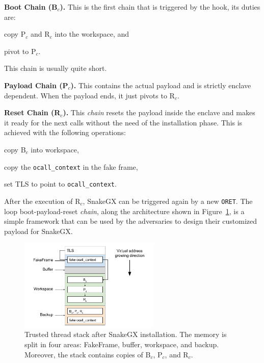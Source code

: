 \textbf{Boot Chain (B$_c$).} This is the first chain that is triggered by 
the hook, its duties are:
\begin{enumerate*}[label=(\roman*)]
	\item copy P$_c$ and R$_c$ into the workspace, and
	\item pivot to P$_c$.
\end{enumerate*} 
This chain is usually quite short.

\textbf{Payload Chain (P$_c$).} This contains the actual payload 
and is strictly enclave dependent. When the payload ends, it just pivots to 
R$_c$.

\textbf{Reset Chain (R$_c$).} 
This \emph{chain} resets the payload inside the enclave and makes it ready for 
the next calls without the need of the installation phase.
This is achieved with the following operations:
\begin{enumerate*}[label=(\roman*)]
	\item copy B$_c$ into workspace,
	\item copy the \texttt{ocall\_context} in the fake frame,
	\item set TLS to point to \texttt{ocall\_context}.
\end{enumerate*}

After the execution of R$_c$, SnakeGX can be triggered again by a new 
\texttt{ORET}.
The loop boot-payload-reset \emph{chain}, along the architecture shown in 
Figure~\ref{fig:t-thread-stack-installed}, is a simple framework that can be 
used by the adversaries to design their customized payload for SnakeGX.

\begin{figure}[t]
	\centering
	\includegraphics[width=0.6\textwidth]{fig_c5/t-thread-stack-installed.pdf}
	\caption{Trusted thread stack after SnakeGX installation. The memory is 
		split in four areas: FakeFrame, buffer, workspace, and backup. 
		Moreover, 
		the stack contains copies of B$_{c}$, P$_{c}$, and R$_{c}$.}
	\label{fig:t-thread-stack-installed}
\end{figure}

